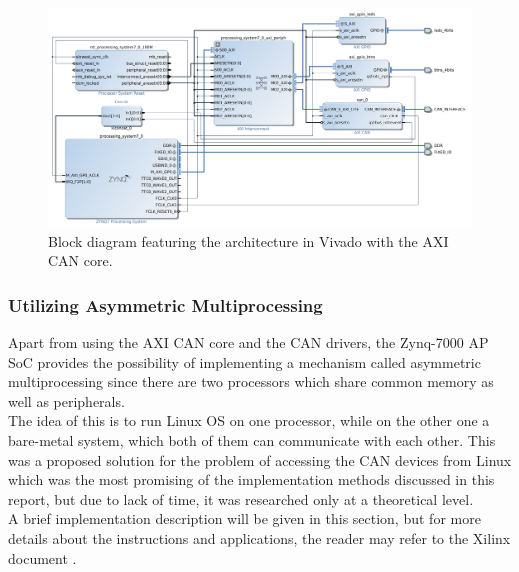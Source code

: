 \begin{figure}[h!]
	\centering
	\includegraphics[width = 1.2\linewidth]{graphics/Zybo_Arch_with_AXI_CAN.png}
	\caption{Block diagram featuring the architecture in Vivado with the AXI CAN core.}
	\label{fig:CAN_Arch_with_AXI_CAN}
\end{figure}

\subsubsection{Utilizing Asymmetric Multiprocessing}

Apart from using the AXI CAN core and the CAN drivers, the Zynq-7000 AP SoC provides the possibility of implementing a mechanism called asymmetric multiprocessing since there are two processors which share common memory as well as peripherals.
\\
The idea of this is to run Linux OS on one processor, while on the other one a bare-metal system, which both of them can communicate with each other.
This was a proposed solution for the problem of accessing the CAN devices from Linux which was the most promising of the implementation methods discussed in this report, but due to lack of time, it was researched only at a theoretical level.
\\
A brief implementation description will be given in this section, but for more details about the instructions and applications, the reader may refer to the Xilinx document \cite{Xilinx_AMP}.

